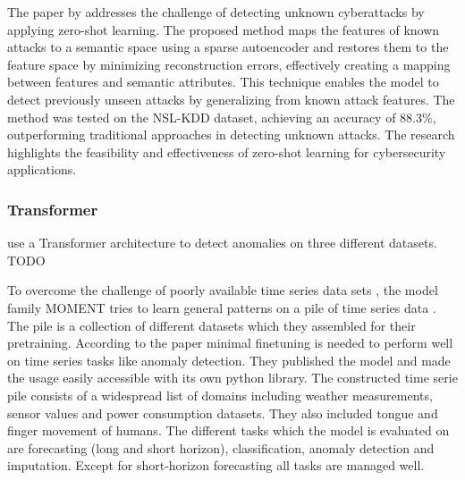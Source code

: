 The paper by  addresses the challenge of detecting unknown cyberattacks by applying zero-shot learning. The proposed method maps the features of known attacks to a semantic space using a sparse autoencoder and restores them to the feature space by minimizing reconstruction errors, effectively creating a mapping between features and semantic attributes. This technique enables the model to detect previously unseen attacks by generalizing from known attack features. The method was tested on the NSL-KDD dataset, achieving an accuracy of 88.3\%, outperforming traditional approaches in detecting unknown attacks. The research highlights the feasibility and effectiveness of zero-shot learning for cybersecurity applications.












\subsubsection{Transformer}
 use a Transformer architecture to detect anomalies on three different datasets. TODO

To overcome the challenge of poorly available time series data sets , the model family MOMENT tries to learn general patterns on a pile of time series data . The pile is a collection of different datasets which they assembled for their pretraining. According to the paper minimal finetuning is needed to perform well on time series tasks like anomaly detection. They published the model and made the usage easily accessible with its own python library. The constructed time serie pile consists of a widespread list of domains including weather measurements, sensor values and power consumption datasets. They also included tongue and finger movement of humans. The different tasks which the model is evaluated on are forecasting (long and short horizon), classification, anomaly detection and imputation. Except for short-horizon forecasting all tasks are managed well.

